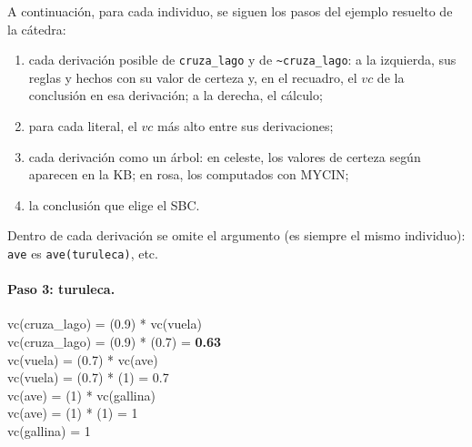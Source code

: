 \documentclass[11pt,a4paper]{article}
\newcommand{\nf}{\textasciitilde}
\begin{document}
\par\medskip\noindent\begin{minipage}{\linewidth}
\centering
\def\vG{}\def\vP{}\def\vA{}\def\vN{}\def\vV{}\def\vNV{}\def\vC{}\def\vNC{}
\def\extraG{}
\grafocf
{}
\end{minipage}\par\medskip

A continuación, para cada individuo, se siguen los pasos del ejemplo resuelto de la cátedra:
\begin{enumerate}
  \item cada derivación posible de \texttt{cruza\_lago} y de \texttt{\nf cruza\_lago}: a la izquierda, sus reglas y hechos con su valor de certeza y, en el recuadro, el $vc$ de la conclusión en esa derivación; a la derecha, el cálculo;
  \item para cada literal, el $vc$ más alto entre sus derivaciones;
  \item cada derivación como un árbol: en \colorbox{celeste}{celeste}, los valores de certeza según aparecen en la KB; en \colorbox{rosa}{rosa}, los computados con MYCIN;
  \item la conclusión que elige el SBC.
\end{enumerate}
Dentro de cada derivación se omite el argumento (es siempre el mismo individuo): \texttt{ave} es \texttt{ave(turuleca)}, etc.

\paragraph{Paso 3: turuleca.}


{vc(cruza\_lago) = (0.9) * vc(vuela)\\ vc(cruza\_lago) = (0.9) * (0.7) = \textbf{0.63}\\[3pt]
 vc(vuela) = (0.7) * vc(ave)\\ vc(vuela) = (0.7) * (1) = 0.7\\
 vc(ave) = (1) * vc(gallina)\\ vc(ave) = (1) * (1) = 1\\
 vc(gallina) = 1}
\end{document}

